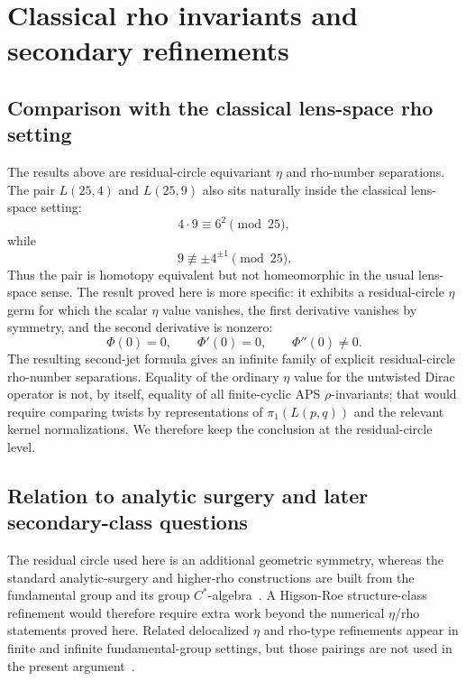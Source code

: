 \documentclass{article}
\theoremstyle{definition}
\numberwithin{equation}{section}
\begin{document}
\section{Classical rho invariants and secondary refinements}
\label{sec:scope-limitations}

\subsection{Comparison with the classical lens-space rho setting}

The results above are residual-circle equivariant $\eta$ and rho-number separations.  The pair $L(25,4)$ and $L(25,9)$ also sits naturally inside the classical lens-space setting: 
\begin{equation}
4\cdot9\equiv6^2\pmod {25},
\end{equation}
while
\begin{equation}
9\not\equiv \pm4^{\pm1}\pmod {25}.
\end{equation}
Thus the pair is homotopy equivalent but not homeomorphic in the usual lens-space sense.  The result proved here is more specific: it exhibits a residual-circle $\eta$ germ for which the scalar $\eta$ value vanishes, the first derivative vanishes by symmetry, and the second derivative is nonzero:
\begin{equation}
\Phi(0)=0,
\qquad
\Phi'(0)=0,
\qquad
\Phi''(0)\neq 0.
\end{equation}
The resulting second-jet formula gives an infinite family of explicit residual-circle rho-number separations.  Equality of the ordinary $\eta$ value for the untwisted Dirac operator is not, by itself, equality of all finite-cyclic APS $\rho$-invariants; that would require comparing twists by representations of $\pi_1(L(p,q))$ and the relevant kernel normalizations.  We therefore keep the conclusion at the residual-circle level.

\subsection{Relation to analytic surgery and later secondary-class questions}

The residual circle used here is an additional geometric symmetry, whereas the standard analytic-surgery and higher-rho constructions are built from the fundamental group and its group $C^*$-algebra~\cite{HigsonRoeAnalyticKH,HigsonRoeSurgery,PiazzaSchick}.  A Higson-Roe structure-class refinement would therefore require extra work beyond the numerical $\eta$/rho statements proved here.  Related delocalized $\eta$ and rho-type refinements appear in finite and infinite fundamental-group settings, but those pairings are not used in the present argument~\cite{LottDelocalized}.
\end{document}
